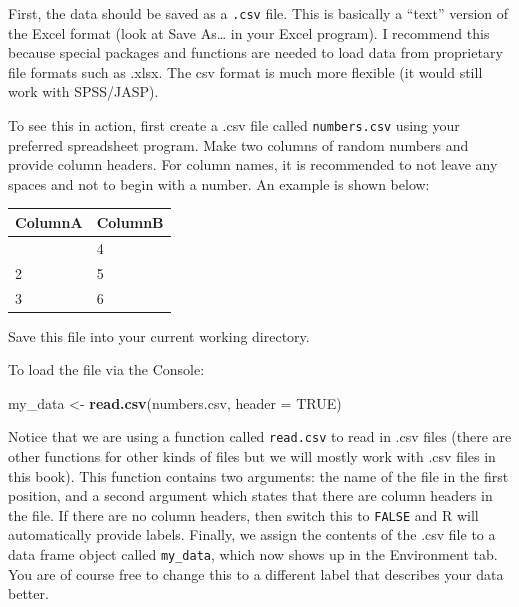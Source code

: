 \documentclass[
]{book}
\newenvironment{Shaded}{\begin{snugshade}}{\end{snugshade}}
\newcommand{\AttributeTok}[1]{\textcolor[rgb]{0.13,0.29,0.53}{#1}}
\newcommand{\ConstantTok}[1]{\textcolor[rgb]{0.56,0.35,0.01}{#1}}
\newcommand{\FunctionTok}[1]{\textcolor[rgb]{0.13,0.29,0.53}{\textbf{#1}}}
\newcommand{\NormalTok}[1]{#1}
\newcommand{\OtherTok}[1]{\textcolor[rgb]{0.56,0.35,0.01}{#1}}
\newcommand{\StringTok}[1]{\textcolor[rgb]{0.31,0.60,0.02}{#1}}
\newcounter{none} %
\begin{document}
First, the data should be saved as a \texttt{.csv} file. This is basically a ``text'' version of the Excel format (look at Save As\ldots{} in your Excel program). I recommend this because special packages and functions are needed to load data from proprietary file formats such as .xlsx. The csv format is much more flexible (it would still work with SPSS/JASP).

To see this in action, first create a .csv file called \texttt{numbers.csv} using your preferred spreadsheet program. Make two columns of random numbers and provide column headers. For column names, it is recommended to not leave any spaces and not to begin with a number. An example is shown below:

{\def\LTcaptype{none} %
\begin{longtable}[]{@{}ll@{}}
\toprule\noalign{}
ColumnA & ColumnB \\
\midrule\noalign{}
\endhead
\bottomrule\noalign{}
\endlastfoot
1 & 4 \\
2 & 5 \\
3 & 6 \\
\end{longtable}
}

Save this file into your current working directory.

To load the file via the Console:

\begin{Shaded}
\begin{Highlighting}[]
\NormalTok{my\_data }\OtherTok{\textless{}{-}} \FunctionTok{read.csv}\NormalTok{(}\StringTok{\textquotesingle{}numbers.csv\textquotesingle{}}\NormalTok{, }\AttributeTok{header =} \ConstantTok{TRUE}\NormalTok{)}
\end{Highlighting}
\end{Shaded}

Notice that we are using a function called \texttt{read.csv} to read in .csv files (there are other functions for other kinds of files but we will mostly work with .csv files in this book). This function contains two arguments: the name of the file in the first position, and a second argument which states that there are column headers in the file. If there are no column headers, then switch this to \texttt{FALSE} and R will automatically provide labels. Finally, we assign the contents of the .csv file to a data frame object called \texttt{my\_data}, which now shows up in the Environment tab. You are of course free to change this to a different label that describes your data better.
\end{document}
